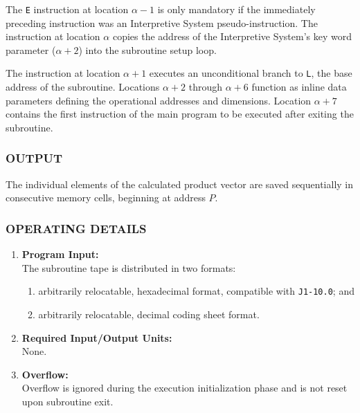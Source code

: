 \documentclass{article}
\begin{document}
\medskip
\noindent
The \texttt{E} instruction at location $\alpha - 1$ is only mandatory if the immediately preceding instruction was an Interpretive System pseudo-instruction. The instruction at location $\alpha$ copies the address of the Interpretive System's key word parameter ($\alpha + 2$) into the subroutine setup loop.

\noindent
The instruction at location $\alpha + 1$ executes an unconditional branch to \texttt{L}, the base address of the subroutine. Locations $\alpha + 2$ through $\alpha + 6$ function as inline data parameters defining the operational addresses and dimensions. Location $\alpha + 7$ contains the first instruction of the main program to be executed after exiting the subroutine.

\subsubsection*{OUTPUT}
The individual elements of the calculated product vector are saved sequentially in consecutive memory cells, beginning at address $P$.

\subsubsection*{OPERATING DETAILS}

\begin{enumerate}[leftmargin=1.5em, itemsep=6pt]
    \item \textbf{Program Input:} \\
    The subroutine tape is distributed in two formats:
    \begin{enumerate}[label=\alph*), itemsep=2pt, topsep=2pt]
        \item arbitrarily relocatable, hexadecimal format, compatible with \texttt{J1-10.0}; and
        \item arbitrarily relocatable, decimal coding sheet format.
    \end{enumerate}
    
    \item \textbf{Required Input/Output Units:} \\
    None.
    
    \item \textbf{Overflow:} \\
    Overflow is ignored during the execution initialization phase and is not reset upon subroutine exit.
\end{enumerate}
\end{document}
